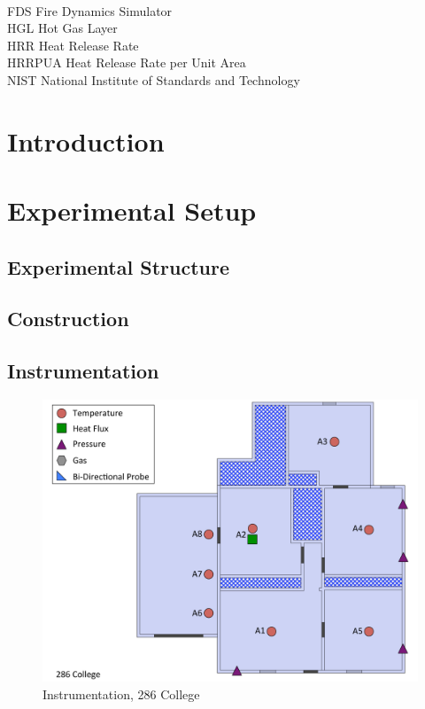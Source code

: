 \documentclass[12pt,oneside]{book}
\begin{document}
\begin{tabbing}
\hspace{1.5in} \= \\
FDS \> Fire Dynamics Simulator \\
HGL \> Hot Gas Layer \\
HRR \> Heat Release Rate \\
HRRPUA \> Heat Release Rate per Unit Area \\
NIST \> National Institute of Standards and Technology \\
\end{tabbing}

\mainmatter

\chapter{Introduction}
\label{chap:Introduction}

\chapter{Experimental Setup}
\label{chap:Experimental_Setup}

\section{Experimental Structure}
\label{sec:Experimental_Structure}

\section{Construction}
\label{sec:Construction}

\section{Instrumentation}
\label{sec:Instrumentation}

\begin{figure}[!ht]
\includegraphics[width=6in]{../Figures/Instrumentation/286_College}
\caption{Instrumentation, 286 College}
\label{fig:Instrumentation_286_College}
\end{figure}
\end{document}

